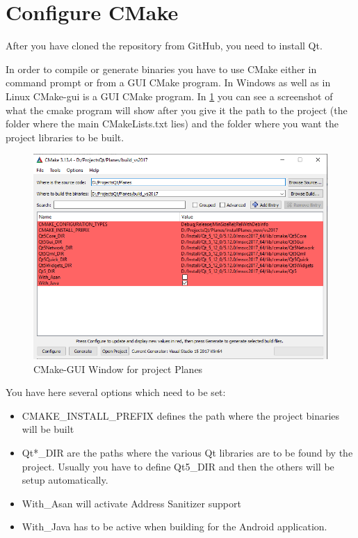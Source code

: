\section{Configure CMake}

After you have cloned the repository from GitHub, you need to install Qt.

In order to compile or generate binaries you have to use CMake either in command prompt or from a GUI CMake program. In Windows as well as in Linux CMake-gui is a GUI CMake program. In \ref{fig:cmakegui_planes} you can see a screenshot of what the cmake program will show after you give it the path to the project (the folder where the main CMakeLists.txt lies) and the folder where you want the project libraries to be built.


\begin{figure}[h]
	\includegraphics[width = \textwidth]{PlanesCPlusPlus_CMAKE_GUI_Window.png}
	\caption{CMake-GUI Window for project Planes}
	\label{fig:cmakegui_planes}
\end{figure}

You have here several options which need to be set:

\begin{itemize}
	\item CMAKE\_INSTALL\_PREFIX defines the path where the project binaries will be built
	\item Qt*\_DIR are the paths where the various Qt libraries are to be found by the project. Usually you have to define Qt5\_DIR and then the others will be setup automatically.
	\item With\_Asan will activate Address Sanitizer support
	\item With\_Java has to be active when building for the Android application.
\end{itemize}

